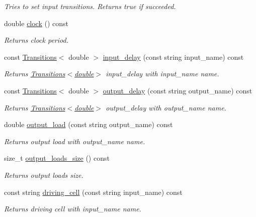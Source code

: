 \begin{DoxyCompactItemize}
\begin{DoxyCompactList}\small\item\em Tries to set input transitions. Returns true if succeeded. \end{DoxyCompactList}\item 
double \hyperlink{classDesign__Constraints_a535cc6d955b52c959b566510c1e3544a}{clock} () const 
\begin{DoxyCompactList}\small\item\em Returns clock period. \end{DoxyCompactList}\item 
const \hyperlink{classTransitions}{Transitions}$<$ double $>$ \hyperlink{classDesign__Constraints_ae67988a0cd0ba0ab5ad1463c273eb287}{input\-\_\-delay} (const string input\-\_\-name) const 
\begin{DoxyCompactList}\small\item\em Returns \hyperlink{classTransitions}{Transitions$<$double$>$} input\-\_\-delay with input\-\_\-name name. \end{DoxyCompactList}\item 
const \hyperlink{classTransitions}{Transitions}$<$ double $>$ \hyperlink{classDesign__Constraints_a07810050c6ae8a62d1e77ee23ad1f660}{output\-\_\-delay} (const string output\-\_\-name) const 
\begin{DoxyCompactList}\small\item\em Returns \hyperlink{classTransitions}{Transitions$<$double$>$} output\-\_\-delay with output\-\_\-name name. \end{DoxyCompactList}\item 
double \hyperlink{classDesign__Constraints_ab21387336a70852447a1d16e11358840}{output\-\_\-load} (const string output\-\_\-name) const 
\begin{DoxyCompactList}\small\item\em Returns output load with output\-\_\-name name. \end{DoxyCompactList}\item 
size\-\_\-t \hyperlink{classDesign__Constraints_a840bdfc3346651f9925ef35590f8c55b}{output\-\_\-loads\-\_\-size} () const 
\begin{DoxyCompactList}\small\item\em Returns output loads size. \end{DoxyCompactList}\item 
const string \hyperlink{classDesign__Constraints_a3155a41841b4c24e3f79e6e1a280d6df}{driving\-\_\-cell} (const string input\-\_\-name) const 
\begin{DoxyCompactList}\small\item\em Returns driving cell with input\-\_\-name name. \end{DoxyCompactList}\item 

\end{DoxyCompactItemize}
